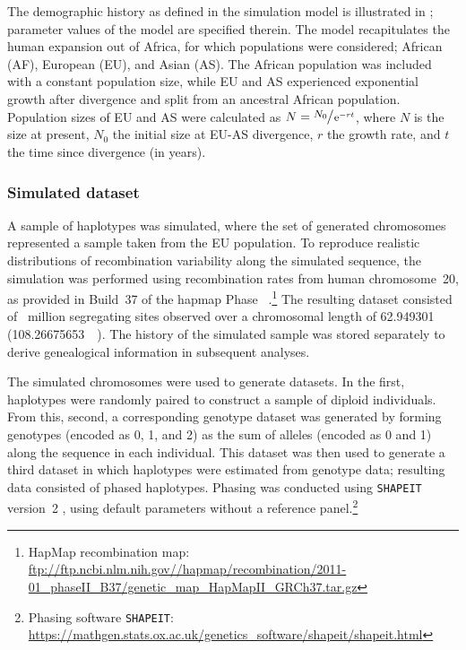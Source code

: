 %

%

The demographic history as defined in the simulation model is illustrated in ; parameter values of the model are specified therein.
The model recapitulates the human expansion out of Africa, for which  populations were considered; African (AF), European (EU), and Asian (AS).
The African population was included with a constant population size, while EU and AS experienced exponential growth after divergence and split from an ancestral African population.
Population sizes of EU and AS were calculated as ${N = \large \sfrac{N_0}{\,\mathrm{e}^{-r t}}}$, where $N$ is the size at present, $N_0$ the initial size at EU-AS divergence, $r$ the growth rate, and $t$ the time since divergence (in years).


%
\subsubsection{Simulated dataset}\label{sec:simdata}
%

A sample of  haplotypes was simulated, where the set of generated chromosomes represented a sample taken from the EU population.
To reproduce realistic distributions of recombination variability along the simulated sequence, the simulation was performed using recombination rates from human chromosome~20, as provided in Build~37 of the \gls{hapmap} Phase~ \citep{Frazer:2007kha, InternationalHapMapConsortium:2010en}.\footnote{HapMap recombination map: \url{ftp://ftp.ncbi.nlm.nih.gov//hapmap/recombination/2011-01_phaseII_B37/genetic_map_HapMapII_GRCh37.tar.gz} }
The resulting dataset consisted of ~million segregating sites observed over a chromosomal length of \SI{62.949301}{\mega\basepair} (\SI{108.26675653}{\centi\morgan}).
The history of the simulated sample was stored separately to derive genealogical information in subsequent analyses.

The simulated chromosomes were used to generate  datasets.
In the first, haplotypes were randomly paired to construct a sample of  diploid individuals.
From this, second, a corresponding genotype dataset was generated by forming genotypes (encoded as 0, 1, and 2) as the sum of alleles (encoded as 0 and 1) along the sequence in each individual.
This dataset was then used to generate a third dataset in which haplotypes were estimated from genotype data;
\ie resulting data consisted of phased haplotypes.
Phasing was conducted using \texttt{SHAPEIT} version~2 \citep{Delaneau:2008dk,Delaneau:2013hi}, using default parameters without a reference panel.\footnote{Phasing software \texttt{SHAPEIT}: \url{https://mathgen.stats.ox.ac.uk/genetics_software/shapeit/shapeit.html} }


